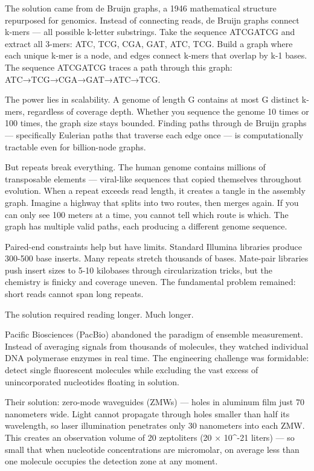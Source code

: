 The solution came from de Bruijn graphs, a 1946 mathematical structure repurposed for genomics. Instead of connecting reads, de Bruijn graphs connect k-mers — all possible k-letter substrings. Take the sequence ATCGATCG and extract all 3-mers: ATC, TCG, CGA, GAT, ATC, TCG. Build a graph where each unique k-mer is a node, and edges connect k-mers that overlap by k-1 bases. The sequence ATCGATCG traces a path through this graph: ATC→TCG→CGA→GAT→ATC→TCG.

The power lies in scalability. A genome of length G contains at most G distinct k-mers, regardless of coverage depth. Whether you sequence the genome 10 times or 100 times, the graph size stays bounded. Finding paths through de Bruijn graphs — specifically Eulerian paths that traverse each edge once — is computationally tractable even for billion-node graphs.

But repeats break everything. The human genome contains millions of transposable elements — viral-like sequences that copied themselves throughout evolution. When a repeat exceeds read length, it creates a tangle in the assembly graph. Imagine a highway that splits into two routes, then merges again. If you can only see 100 meters at a time, you cannot tell which route is which. The graph has multiple valid paths, each producing a different genome sequence.

Paired-end constraints help but have limits. Standard Illumina libraries produce 300-500 base inserts. Many repeats stretch thousands of bases. Mate-pair libraries push insert sizes to 5-10 kilobases through circularization tricks, but the chemistry is finicky and coverage uneven. The fundamental problem remained: short reads cannot span long repeats.

The solution required reading longer. Much longer.

Pacific Biosciences (PacBio) abandoned the paradigm of ensemble measurement. Instead of averaging signals from thousands of molecules, they watched individual DNA polymerase enzymes in real time. The engineering challenge was formidable: detect single fluorescent molecules while excluding the vast excess of unincorporated nucleotides floating in solution.

Their solution: zero-mode waveguides (ZMWs) — holes in aluminum film just 70 nanometers wide. Light cannot propagate through holes smaller than half its wavelength, so laser illumination penetrates only 30 nanometers into each ZMW. This creates an observation volume of 20 zeptoliters (20 × 10^-21 liters) — so small that when nucleotide concentrations are micromolar, on average less than one molecule occupies the detection zone at any moment.

